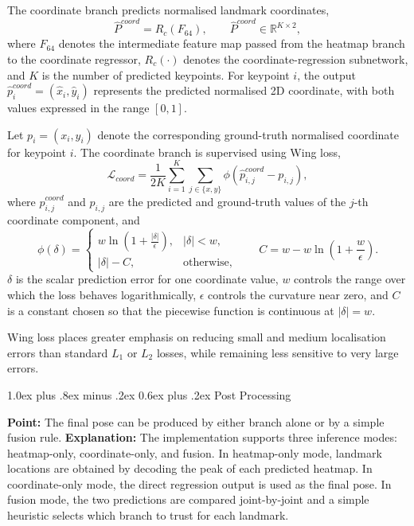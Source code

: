 \documentclass[10pt,letterpaper]{article}
\makeatletter
\renewcommand\subsection{\@startsection{subsection}{2}{\z@}%
  {1.0ex plus .8ex minus .2ex}%
  {0.6ex plus .2ex}%
  {\normalfont\itshape}}
\makeatother
\begin{document}
The coordinate branch predicts normalised landmark coordinates,
\[
\hat{P}^{coord} = R_c(F_{64}), \qquad \hat{P}^{coord} \in \mathbb{R}^{K \times 2},
\]
where \(F_{64}\) denotes the intermediate feature map passed from the heatmap branch to the coordinate regressor, \(R_c(\cdot)\) denotes the coordinate-regression subnetwork, and \(K\) is the number of predicted keypoints. For keypoint \(i\), the output \(\hat{p}^{coord}_i = (\hat{x}_i, \hat{y}_i)\) represents the predicted normalised 2D coordinate, with both values expressed in the range \([0,1]\).

Let \(p_i = (x_i, y_i)\) denote the corresponding ground-truth normalised coordinate for keypoint \(i\). The coordinate branch is supervised using Wing loss,
\[
\mathcal{L}_{coord}
=
\frac{1}{2K}
\sum_{i=1}^{K}
\sum_{j \in \{x,y\}}
\phi\!\left(\hat{p}^{coord}_{i,j} - p_{i,j}\right),
\]
where \(\hat{p}^{coord}_{i,j}\) and \(p_{i,j}\) are the predicted and ground-truth values of the \(j\)-th coordinate component, and
\[
\phi(\delta)=
\begin{cases}
w \ln\left(1 + \frac{|\delta|}{\epsilon}\right), & |\delta| < w, \\
|\delta| - C, & \text{otherwise,}
\end{cases}
\qquad
C = w - w \ln\left(1 + \frac{w}{\epsilon}\right).
\]
\(\delta\) is the scalar prediction error for one coordinate value, \(w\) controls the range over which the loss behaves logarithmically, \(\epsilon\) controls the curvature near zero, and \(C\) is a constant chosen so that the piecewise function is continuous at \(|\delta| = w\).

Wing loss places greater emphasis on reducing small and medium localisation errors than standard \(L_1\) or \(L_2\) losses, while remaining less sensitive to very large errors.

\subsection{Post Processing}

\noindent\textbf{Point:} The final pose can be produced by either branch alone or by a simple fusion rule.  
\textbf{Explanation:} The implementation supports three inference modes: heatmap-only, coordinate-only, and fusion. In heatmap-only mode, landmark locations are obtained by decoding the peak of each predicted heatmap. In coordinate-only mode, the direct regression output is used as the final pose. In fusion mode, the two predictions are compared joint-by-joint and a simple heuristic selects which branch to trust for each landmark.
\end{document}
